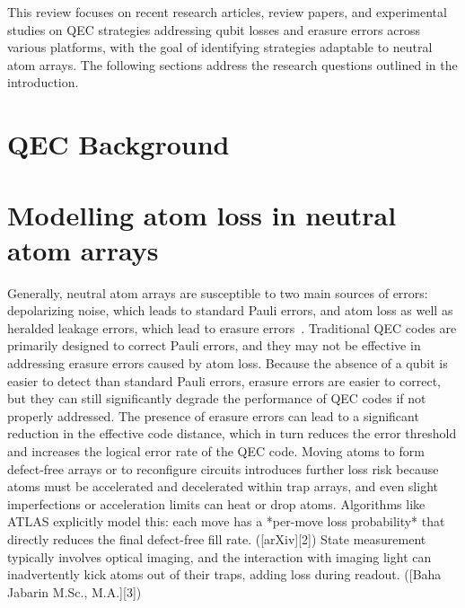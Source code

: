 \documentclass[aps,prb,twocolumn,superscriptaddress,nobibnotes]{revtex4-2} %
\begin{document}
This review focuses on recent research articles, review papers, and experimental studies on QEC strategies addressing qubit losses and erasure errors across various platforms, with the goal of identifying strategies adaptable to neutral atom arrays.
The following sections address the research questions outlined in the introduction.


\section{QEC Background}%

\section{Modelling atom loss in neutral atom arrays}
Generally, neutral atom arrays are susceptible to two main sources of errors: depolarizing noise, which leads to standard Pauli errors, and atom loss as well as heralded leakage errors, which lead to erasure errors~\cite{Perrin_2025}.
Traditional QEC codes are primarily designed to correct Pauli errors, and they may not be effective in addressing erasure errors caused by atom loss.
Because the absence of a qubit is easier to detect than standard Pauli errors, erasure errors are easier to correct, but they can still significantly degrade the performance of QEC codes if not properly addressed.
The presence of erasure errors can lead to a significant reduction in the effective code distance, which in turn reduces the error threshold and increases the logical error rate of the QEC code.
Moving atoms to form defect-free arrays or to reconfigure circuits introduces further loss risk because atoms must be accelerated and decelerated within trap arrays, and even slight imperfections or acceleration limits can heat or drop atoms. Algorithms like ATLAS explicitly model this: each move has a *per-move loss probability* that directly reduces the final defect-free fill rate. ([arXiv][2])
State measurement typically involves optical imaging, and the interaction with imaging light can inadvertently kick atoms out of their traps, adding loss during readout. ([Baha Jabarin M.Sc., M.A.][3])
\end{document}
